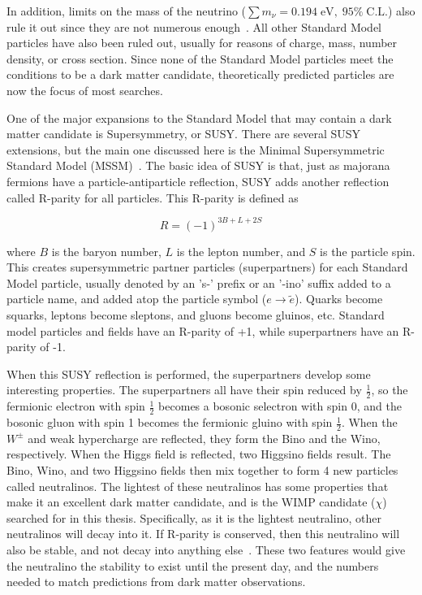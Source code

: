 In addition, limits on the mass of the neutrino ($\sum{}m_{\nu} = 0.194 \; \textrm{eV}, \; 95\% \; \textrm{C.L.}$) also rule it out since they are not numerous enough~\cite{planck2015}.
All other Standard Model particles have also been ruled out, usually for reasons of charge, mass, number density, or cross section.
Since none of the Standard Model particles meet the conditions to be a dark matter candidate, theoretically predicted particles are now the focus of most searches.

One of the major expansions to the Standard Model that may contain a dark matter candidate is Supersymmetry, or SUSY.
There are several SUSY extensions, but the main one discussed here is the Minimal Supersymmetric Standard Model (MSSM)~\cite{MSSM,supersym1,schelke_thesis}.
The basic idea of SUSY is that, just as majorana fermions have a particle-antiparticle reflection, SUSY adds another reflection called R-parity for all particles. 
This R-parity is defined as

\begin{equation}
  R = (-1)^{3B+L+2S}
\end{equation}

where $B$ is the baryon number, $L$ is the lepton number, and $S$ is the particle spin.
This creates supersymmetric partner particles (superpartners) for each Standard Model particle, usually denoted by an 's-' prefix or an '-ino' suffix added to a particle name, and \nicetilde{} added atop the particle symbol ($e \rightarrow \tilde{e}$).
Quarks become squarks, leptons become sleptons, and gluons become gluinos, etc.
Standard model particles and fields have an R-parity of +1, while superpartners have an R-parity of -1.

When this SUSY reflection is performed, the superpartners develop some interesting properties.
The superpartners all have their spin reduced by $\frac{1}{2}$, so the fermionic electron with spin $\frac{1}{2}$ becomes a bosonic selectron with spin $0$, and the bosonic gluon with spin 1 becomes the fermionic gluino with spin $\frac{1}{2}$.
When the $W^{\pm}$  and weak hypercharge are reflected, they form the Bino and the Wino, respectively.
When the Higgs field is reflected, two Higgsino fields result.
The Bino, Wino, and two Higgsino fields then mix together to form 4 new particles called neutralinos.
The lightest of these neutralinos has some properties that make it an excellent dark matter candidate, and is the WIMP candidate ($\chi$) searched for in this thesis.
Specifically, as it is the lightest neutralino, other neutralinos will decay into it.
If R-parity is conserved, then this neutralino will also be stable, and not decay into anything else~\cite{neutralino1,neutralino2,neutralino3}.
These two features would give the neutralino the stability to exist until the present day, and the numbers needed to match predictions from dark matter observations.

